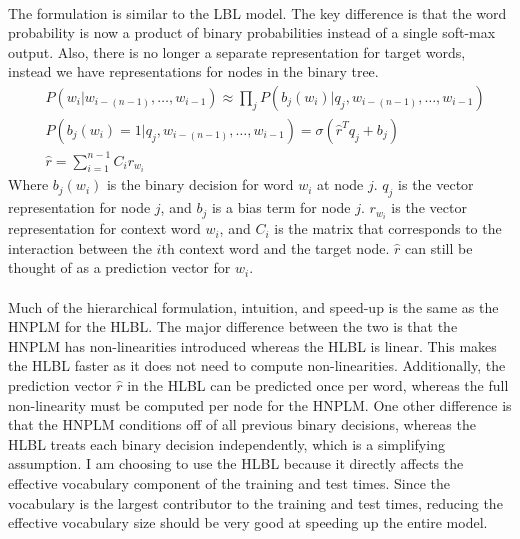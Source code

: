 \paragraph{}
The formulation is similar to the LBL model. The key difference is that the word probability is now a product of binary probabilities instead of a single soft-max output. Also, there is no longer a separate representation for target words, instead we have representations for nodes in the binary tree.
\begin{align}
&P(w_i | w_{i-(n-1)},\dots, w_{i-1})  \approx \prod_j P(b_j(w_i) | q_j, w_{i-(n-1)},\dots, w_{i-1}) \label{eq:HLBL}
\\ 
&P(b_j(w_i) = 1 | q_j, w_{i-(n-1)},\dots, w_{i-1}) =  \sigma( \hat{r}^T q_{j} +b_{j})
\\ 
&\hat{r} = \sum_{i=1}^{n-1} C_i r_{w_i} \nonumber
\end{align}
Where $b_j(w_i)$ is the binary decision for word $w_i$ at node $j$. $q_j$ is the vector representation for node $j$, and $b_{j}$ is a bias term for node $j$. $r_{w_i}$ is the vector representation for context word $w_i$, and $C_i$ is the matrix that corresponds to the interaction between the $i$th context word and the target node.  $\hat{r}$ can still be thought of as a prediction vector for $w_i$. 

\paragraph{}
Much of the hierarchical formulation, intuition, and speed-up is the same as the HNPLM for the HLBL. The major difference between the two is that the HNPLM has non-linearities introduced whereas the HLBL is linear. This makes the HLBL faster as it does not need to compute non-linearities. Additionally, the prediction vector $\hat{r}$ in the HLBL can be predicted once per word, whereas the full non-linearity must be computed per node for the HNPLM. One other difference is that the HNPLM conditions off of all previous binary decisions, whereas the HLBL treats each binary decision independently, which is a simplifying assumption. I am choosing to use the HLBL because it directly affects the effective vocabulary component of the training and test times. Since the vocabulary is the largest contributor to the training and test times, reducing the effective vocabulary size should be very good at speeding up the entire model.

